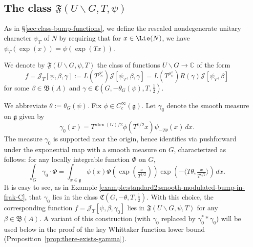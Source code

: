 \subsection{The class $\mathfrak{F}(U \backslash G, T, \psi)$}

As in \S\ref{sec:class-bump-functions}, we define the rescaled nondegenerate unitary character $\psi_T$ of $N$ by requiring that for $x \in \Lie(N)$, we have $\psi_T(\exp(x)) = \psi(\exp(T x))$.

\begin{definition}\label{defn:standard2:we-denote-mathfrakfu}
  We denote by $\mathfrak{F}(U \backslash G, \psi, T)$ the class  of functions $U \backslash G \rightarrow \mathbb{C}$ of the form
  \begin{equation*}
    f =
    \mathcal{J}_T[\psi,\beta,\gamma]
    :=
    L(T^{\rho_U^\vee })
    \mathcal{J}[\psi_T,\beta,\gamma]
    =
    L(T^{\rho_U^\vee })
    R(\gamma)
    \mathcal{J}[\psi_T,\beta]
  \end{equation*}
  for some $\beta \in \mathfrak{B}(A)$ and $\gamma \in \mathfrak{C}(G,-\theta_G(\psi),T,\tfrac{1}{2})$.
\end{definition}

\begin{example}\label{example:cump8dyq7s}
  We abbreviate $\theta := \theta_G(\psi)$.  Fix $\phi \in C_c^\infty(\mathfrak{g})$.  Let $\gamma_0$ denote the smooth measure on $\mathfrak{g}$ given by
  \begin{equation*}
    \gamma_0(x) = T^{\dim(G)/2} \phi(T^{1/2} x) \psi_{- T \theta}(x) \, d x.
  \end{equation*}
  The measure $\gamma_0$ is supported near the origin, hence identifies via pushforward under the exponential map with a smooth measure on $G$, characterized as follows: for any locally integrable function $\Phi$ on $G$,
  \begin{equation}\label{eq:int-_g-gamma_0}
    \int_{G} \gamma_0 \cdot \Phi
    = \int_{x \in \mathfrak{g} }
    \phi(x)
    \Phi (\exp (\tfrac{x}{T^{1/2} }))
    \exp (- \langle T \theta, \tfrac{x}{ T^{1/2} } \rangle)
    \, d x.
  \end{equation}
  It is easy to see, as in Example \ref{example:standard2:smooth-modulated-bump-in-frak-C}, that $\gamma_0$ lies in the class $\mathfrak{C}(G,-\theta,T,\tfrac{1}{2})$.  With this choice, the corresponding function $f = \mathcal{J}_T[\psi, \beta, \gamma_0]$ lies in $\mathfrak{F}(U \backslash G, \psi, T)$ for any $\beta \in \mathfrak{B}(A)$.  A variant of this construction (with $\gamma_0$ replaced by $\gamma_0^* \ast \gamma_0$) will be used below in the proof of the key Whittaker function lower bound (Proposition~\ref{prop:there-exists-gamma}).
\end{example}

